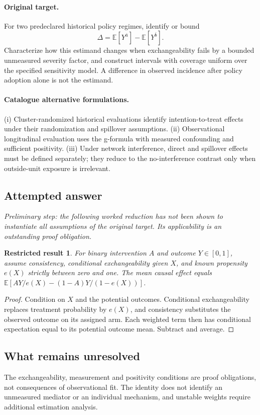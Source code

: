 \documentclass[11pt]{article}
\newcommand{\E}{\mathbb E}
\providecommand{\E}{\mathbb E}
\newtheorem{attemptresult}{Restricted result}[section]
\begin{document}
\paragraph{Original target.}
For two predeclared historical policy regimes, identify or bound
    \[\Delta=\E[Y^{\bar a}]-\E[Y^{\bar b}].\]
    Characterize how this estimand changes when exchangeability fails by a bounded unmeasured severity factor, and construct intervals with coverage uniform over the specified sensitivity model. A difference in observed incidence after policy adoption alone is not the estimand.
\paragraph{Catalogue alternative formulations.}
(i) Cluster-randomized historical evaluations identify intention-to-treat effects under their randomization and spillover assumptions. (ii) Observational longitudinal evaluation uses the g-formula with measured confounding and sufficient positivity. (iii) Under network interference, direct and spillover effects must be defined separately; they reduce to the no-interference contrast only when outside-unit exposure is irrelevant.
\subsection{Attempted answer}
\noindent\emph{Preliminary step: the following worked reduction has not been shown to instantiate all assumptions of the original target. Its applicability is an outstanding proof obligation.}

\begin{attemptresult}
For binary intervention $A$ and outcome $Y\in[0,1]$, assume consistency, conditional exchangeability given $X$, and known propensity $e(X)$ strictly between zero and one. The mean causal effect equals $\E[AY/e(X)-(1-A)Y/(1-e(X))]$.
\end{attemptresult}
\begin{proof}
Condition on $X$ and the potential outcomes. Conditional exchangeability replaces treatment probability by $e(X)$, and consistency substitutes the observed outcome on its assigned arm. Each weighted term then has conditional expectation equal to its potential outcome mean. Subtract and average.
\end{proof}
\subsection{What remains unresolved}
The exchangeability, measurement and positivity conditions are proof obligations, not consequences of observational fit. The identity does not identify an unmeasured mediator or an individual mechanism, and unstable weights require additional estimation analysis.
\end{document}
